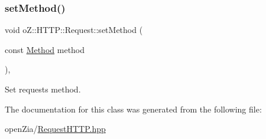 \subsubsection{\texorpdfstring{setMethod()}{setMethod()}}
{\footnotesize\ttfamily void o\+Z\+::\+H\+T\+T\+P\+::\+Request\+::set\+Method (\begin{DoxyParamCaption}\item[{const \mbox{\hyperlink{namespaceo_z_1_1_h_t_t_p_a02d8497e4abbb0adf3af0fe9fad1b7a6}{Method}}}]{method }\end{DoxyParamCaption})\hspace{0.3cm}{\ttfamily [inline]}, {\ttfamily [noexcept]}}



Set request\textquotesingle{}s method. 



The documentation for this class was generated from the following file\+:\begin{DoxyCompactItemize}
\item 
open\+Zia/\mbox{\hyperlink{_request_h_t_t_p_8hpp}{Request\+H\+T\+T\+P.\+hpp}}\end{DoxyCompactItemize}
